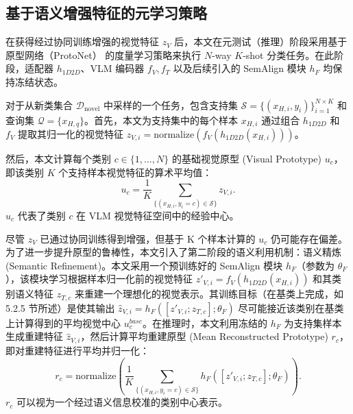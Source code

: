 \subsection{基于语义增强特征的元学习策略}
\label{subsec:semantic_fsl_strategy}

在获得经过协同训练增强的视觉特征 $z_V$ 后，本文在元测试（推理）阶段采用基于原型网络（ProtoNet） 的度量学习策略来执行 $N$-way $K$-shot 分类任务。在此阶段，适配器 $h_{1D2D}$、VLM 编码器 $f_V, f_T$ 以及后续引入的 SemAlign 模块 $h_F$ 均保持冻结状态。 

对于从新类集合 $\mathcal{D}_{\text{novel}}$ 中采样的一个任务，包含支持集 $\mathcal{S} = \{(x_{H,i}, y_i)\}_{i=1}^{N \times K}$ 和查询集 $\mathcal{Q} = \{x_{H,q}\}$。首先，本文为支持集中的每个样本 $x_{H,i}$ 通过组合 $h_{1D2D}$ 和 $f_V$ 提取其归一化的视觉特征 $z_{V,i} = \text{normalize}(f_V(h_{1D2D}(x_{H,i})))$。 

然后，本文计算每个类别 $c \in \{1, \dots, N\}$ 的基础视觉原型 (Visual Prototype) $u_c$，即该类别 $K$ 个支持样本视觉特征的算术平均值： 
\begin{equation} u_c = \frac{1}{K} \sum_{\{(x_{H,i}, y_i=c) \in \mathcal{S}\}} z_{V,i}. \label{eq:visual_prototype} \end{equation} 
$u_c$ 代表了类别 $c$ 在 VLM 视觉特征空间中的经验中心。 

尽管 $z_V$ 已通过协同训练得到增强，但基于 K 个样本计算的 $u_c$ 仍可能存在偏差。为了进一步提升原型的鲁棒性，本文引入了第二阶段的语义利用机制：语义精炼 (Semantic Refinement)。本文采用一个预训练好的 SemAlign 模块 $h_F$（参数为 $\theta_F$），该模块学习根据样本归一化前的视觉特征 $z'_{V,i} = f_V(h_{1D2D}(x_{H,i}))$ 和其类别语义特征 $z_{T,c}$ 来重建一个理想化的视觉表示。其训练目标（在基类上完成，如 5.2.5 节所述）是使其输出 $\hat{z}_{V,i} = h_F([z'_{V,i}; z_{T,c}]; \theta_F)$ 尽可能接近该类别在基类上计算得到的平均视觉中心 $u_c^{base}$。在推理时，本文利用冻结的 $h_F$ 为支持集样本生成重建特征 $\hat{z}_{V,i}$，然后计算平均重建原型 (Mean Reconstructed Prototype) $r_c$，即对重建特征进行平均并归一化： 
\begin{equation} r_c = \text{normalize} \left( \frac{1}{K} \sum_{\{(x_{H,i}, y_i=c) \in \mathcal{S}\}} h_F([z'_{V,i}; z_{T,c}]; \theta_F) \right). \label{eq:reconstructed_prototype} \end{equation} 
$r_c$ 可以视为一个经过语义信息校准的类别中心表示。 

